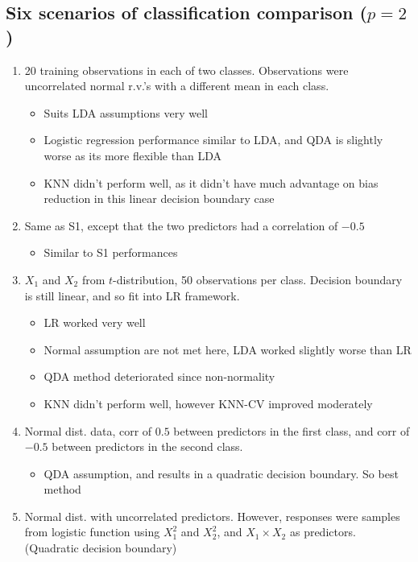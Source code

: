 \documentclass[11pt]{article}
\begin{document}
\subsection{Six scenarios of classification comparison ($p=2$)}
\begin{enumerate}
    \item 20 training observations in each of two classes. Observations were uncorrelated normal r.v.'s with a different mean in each class.
        \begin{itemize}
            \item Suits LDA assumptions very well
            \item Logistic regression performance similar to LDA, and QDA is slightly worse as its more flexible than LDA
            \item KNN didn't perform well, as it didn't have much advantage on bias reduction in this linear decision boundary case
        \end{itemize}
    \item Same as S1, except that the two predictors had a correlation of $-0.5$
        \begin{itemize}
            \item Similar to S1 performances
        \end{itemize}
    \item $X_1$ and $X_2$ from $t$-distribution, 50 observations per class. Decision boundary is still linear, and so fit into LR framework.
        \begin{itemize}
            \item LR worked very well
            \item Normal assumption are not met here, LDA worked slightly worse than LR
            \item QDA method deteriorated since non-normality
            \item KNN didn't perform well, however KNN-CV improved moderately
        \end{itemize}
    \item Normal dist. data, corr of $0.5$ between predictors in the first class, and corr of $-0.5$ between predictors in the second class.
        \begin{itemize}
            \item QDA assumption, and results in a quadratic decision boundary. So best method
        \end{itemize}
    \item Normal dist. with uncorrelated predictors. However, responses were samples from logistic function using $X_1^2$ and $X_2^2$, and $X_1 \times X_2$ as predictors. (Quadratic decision boundary)

\end{enumerate}
\end{document}
